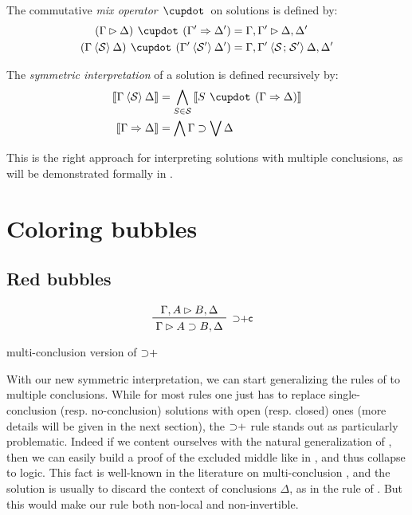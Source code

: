 \begin{definition}
  The commutative \emph{mix operator} $\mix$ on solutions is defined by:
  \begin{align*}
    (\Gamma \J \Delta) \mix (\Gamma' \seq \Delta') &=
      \Gamma, \Gamma' \J \Delta, \Delta' \\
    (\Gamma \piq{\cS} \Delta) \mix (\Gamma' \piq{\mathcal{S'}} \Delta') &=
      \Gamma, \Gamma' \piq{\cS \sep \mathcal{S'}} \Delta, \Delta' \\
  \end{align*}
\end{definition}

\begin{definition}
  The \emph{symmetric interpretation} of a solution is defined recursively by:
  \begin{align*}
    \sint{\Gamma \piq{\cS} \Delta} &=
      \bigwedge_{S \in \cS} \sint{S \mix (\Gamma \seq \Delta)} \\
    \sint{\Gamma \seq \Delta} &=
      \bigwedge \Gamma \limp \bigvee \Delta
  \end{align*}
\end{definition}

This is the right approach for interpreting solutions with multiple conclusions,
as will be demonstrated formally in .

\section{Coloring bubbles}

\subsection{Red bubbles}

\begin{marginfigure}
  $$
  \R[\mathsf{{\limp}{+}c}]
    {\Gamma, A \J B, \Delta}
    {\Gamma \J A \limp B, \Delta}
  $$
  \caption{ multi-conclusion version of ${\supset}{+}$}
\end{marginfigure}

With our new symmetric interpretation, we can start generalizing the rules of
 to multiple conclusions. While for most rules one just has to replace
single-conclusion (resp. no-conclusion) solutions with open (resp. closed) ones
(more details will be given in the next section), the ${\supset}{+}$ rule stands
out as particularly problematic. Indeed if we content ourselves with the natural
generalization {} of , then we can
easily build a proof of the excluded middle like in , and thus
collapse to  logic. This fact is well-known in the literature on
multi-conclusion  , and the solution is usually to
discard the context of conclusions $\Delta$, as in the {} rule
of . But this would make our rule both non-local and
non-invertible.

